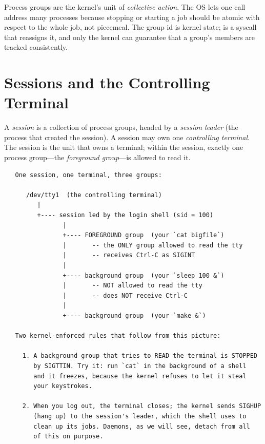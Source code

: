 \begin{osconcept}
Process groups are the kernel's unit of \emph{collective action}. The
OS lets one call address many processes because stopping or starting a
job should be atomic with respect to the whole job, not piecemeal.
The group id is kernel state;  is a syscall that
reassigns it, and only the kernel can guarantee that a group's members
are tracked consistently.
\end{osconcept}

\section{Sessions and the Controlling Terminal}

A \emph{session} is a collection of process groups, headed by a
\emph{session leader} (the process that created the session). A
session may own one \emph{controlling terminal}. The session is the
unit that owns a terminal; within the session, exactly one process
group---the \emph{foreground group}---is allowed to read it.

\begin{verbatim}
   One session, one terminal, three groups:

      /dev/tty1  (the controlling terminal)
         |
         +---- session led by the login shell (sid = 100)
                |
                +---- FOREGROUND group  (your `cat bigfile`)
                |       -- the ONLY group allowed to read the tty
                |       -- receives Ctrl-C as SIGINT
                |
                +---- background group  (your `sleep 100 &`)
                |       -- NOT allowed to read the tty
                |       -- does NOT receive Ctrl-C
                |
                +---- background group  (your `make &`)

   Two kernel-enforced rules that follow from this picture:

     1. A background group that tries to READ the terminal is STOPPED
        by SIGTTIN. Try it: run `cat` in the background of a shell
        and it freezes, because the kernel refuses to let it steal
        your keystrokes.

     2. When you log out, the terminal closes; the kernel sends SIGHUP
        (hang up) to the session's leader, which the shell uses to
        clean up its jobs. Daemons, as we will see, detach from all
        of this on purpose.
\end{verbatim}

